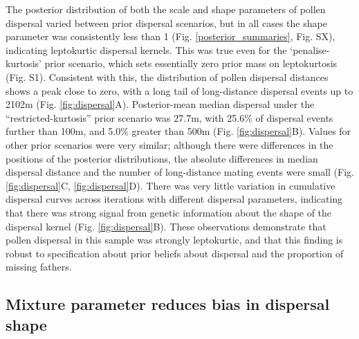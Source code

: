 \documentclass[10pt, a4paper, twocolumn]{article} %
\begin{document}
The posterior distribution of both the scale and shape parameters of pollen dispersal varied between prior dispersal scenarios, but in all cases the shape parameter was consistently less than 1 (Fig. \ref{posterior_summaries}, Fig. SX), indicating leptokurtic dispersal kernels. This was true even for the ‘penalise-kurtosis’ prior scenario, which sets essentially zero prior mass on leptokurtosis (Fig. S1). Consistent with this, the distribution of pollen dispersal distances shows a peak close to zero, with a long tail of long-distance dispersal events up to 2102m (Fig. \ref{fig:dispersal}A). Posterior-mean median dispersal under the “restricted-kurtosis” prior scenario was 27.7m, with 25.6\% of dispersal events further than 100m, and 5.0\% greater than 500m (Fig. \ref{fig:dispersal}B). Values for other prior scenarios were very similar; although there were differences in the positions of the posterior distributions, the absolute differences in median dispersal distance and the number of long-distance mating events were small (Fig. \ref{fig:dispersal}C, \ref{fig:dispersal}D). There was very little variation in cumulative dispersal curves across iterations with different dispersal parameters, indicating that there was strong signal from genetic information about the shape of the dispersal kernel (Fig. \ref{fig:dispersal}B). These observations demonstrate that pollen dispersal in this sample was strongly leptokurtic, and that this finding is robust to specification about prior beliefs about dispersal and the proportion of missing fathers.

\subsection{Mixture parameter reduces bias in dispersal shape}
\end{document}
